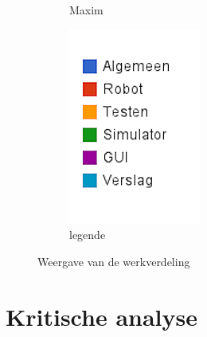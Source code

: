 \documentclass[eind]{penoverslag}
\begin{document}
{\begin{figure}
\begin{subfigure}[hb]{0.15\textwidth}
                \caption{Maxim}
        \end{subfigure}%
        \begin{subfigure}[hb]{0.11\textwidth}
                \centering
                \includegraphics[width=\textwidth]{werk_legende}
                \caption{legende}
        \end{subfigure}
 \caption{Weergave van de werkverdeling}
\label{fig:werkverdeling}
\end{figure}

\section{Kritische analyse}
\label{Assec:kritischeAnalyse}


\begin{thebibliography}{9}


\end{thebibliography}}
\end{document}
